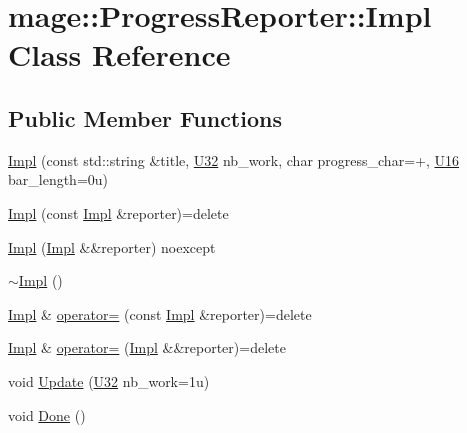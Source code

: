 \hypertarget{classmage_1_1_progress_reporter_1_1_impl}{}\section{mage\+:\+:Progress\+Reporter\+:\+:Impl Class Reference}
\label{classmage_1_1_progress_reporter_1_1_impl}
\subsection*{Public Member Functions}
\begin{DoxyCompactItemize}
\item 
\mbox{\hyperlink{classmage_1_1_progress_reporter_1_1_impl_ab6da9431b3faadf0715b69c11a0a578b}{Impl}} (const std\+::string \&title, \mbox{\hyperlink{namespacemage_a41c104c036fba3756a74e19f793eeaa1}{U32}} nb\+\_\+work, char progress\+\_\+char=\textquotesingle{}+\textquotesingle{}, \mbox{\hyperlink{namespacemage_af69057eec1ce005c1c3b34ae33486f16}{U16}} bar\+\_\+length=0u)
\item 
\mbox{\hyperlink{classmage_1_1_progress_reporter_1_1_impl_af721b271934a492c3a47d8920d76c3c8}{Impl}} (const \mbox{\hyperlink{classmage_1_1_progress_reporter_1_1_impl}{Impl}} \&reporter)=delete
\item 
\mbox{\hyperlink{classmage_1_1_progress_reporter_1_1_impl_ab3b6811ed80a087ac10c90e97730147c}{Impl}} (\mbox{\hyperlink{classmage_1_1_progress_reporter_1_1_impl}{Impl}} \&\&reporter) noexcept
\item 
\mbox{\hyperlink{classmage_1_1_progress_reporter_1_1_impl_af5dbbaa059fdfc22e90e274ba14053a8}{$\sim$\+Impl}} ()
\item 
\mbox{\hyperlink{classmage_1_1_progress_reporter_1_1_impl}{Impl}} \& \mbox{\hyperlink{classmage_1_1_progress_reporter_1_1_impl_a18d90c9b1c400d83d8c3a1ba54b23d69}{operator=}} (const \mbox{\hyperlink{classmage_1_1_progress_reporter_1_1_impl}{Impl}} \&reporter)=delete
\item 
\mbox{\hyperlink{classmage_1_1_progress_reporter_1_1_impl}{Impl}} \& \mbox{\hyperlink{classmage_1_1_progress_reporter_1_1_impl_a39801a31c5265467a8056f2bb125cf39}{operator=}} (\mbox{\hyperlink{classmage_1_1_progress_reporter_1_1_impl}{Impl}} \&\&reporter)=delete
\item 
void \mbox{\hyperlink{classmage_1_1_progress_reporter_1_1_impl_a89d8090c7280c12a046c03df8dc7d7b3}{Update}} (\mbox{\hyperlink{namespacemage_a41c104c036fba3756a74e19f793eeaa1}{U32}} nb\+\_\+work=1u)
\item 
void \mbox{\hyperlink{classmage_1_1_progress_reporter_1_1_impl_a58a0fb3d0e5f164fc36ad7416bb98d2d}{Done}} ()
\end{DoxyCompactItemize}
